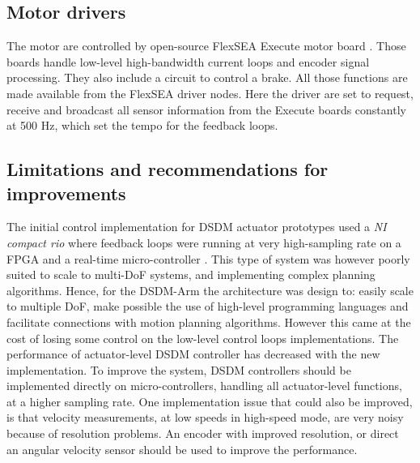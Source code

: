 \subsection{Motor drivers}

The motor are controlled by open-source FlexSEA Execute motor board \cite{duval_flexsea-execute:_2016}. Those boards handle low-level high-bandwidth current loops and encoder signal processing. They also include a circuit to control a brake. All those functions are made available from the FlexSEA driver nodes. Here the driver are set to request, receive and broadcast all sensor information from the Execute boards constantly at 500 Hz, which set the tempo for the feedback loops. 


\subsection{Limitations and recommendations for improvements} 

The initial control implementation for DSDM actuator prototypes used a \textit{NI compact rio} where feedback loops were running at very high-sampling rate on a FPGA and a real-time micro-controller \cite{girard_two-speed_2015}. This type of system was however poorly suited to scale to multi-DoF systems, and implementing complex planning algorithms. Hence, for the DSDM-Arm the architecture was design to: easily scale to multiple DoF, make possible the use of high-level programming languages and facilitate connections with motion planning algorithms. However this came at the cost of losing some control on the low-level control loops implementations. The performance of actuator-level DSDM controller has decreased with the new implementation. To improve the system, DSDM controllers should be implemented directly on micro-controllers, handling all actuator-level functions, at a higher sampling rate. One implementation issue that could also be improved, is that velocity measurements, at low speeds in high-speed mode, are very noisy because of resolution problems. An encoder with improved resolution, or direct an angular velocity sensor should be used to improve the performance. 








